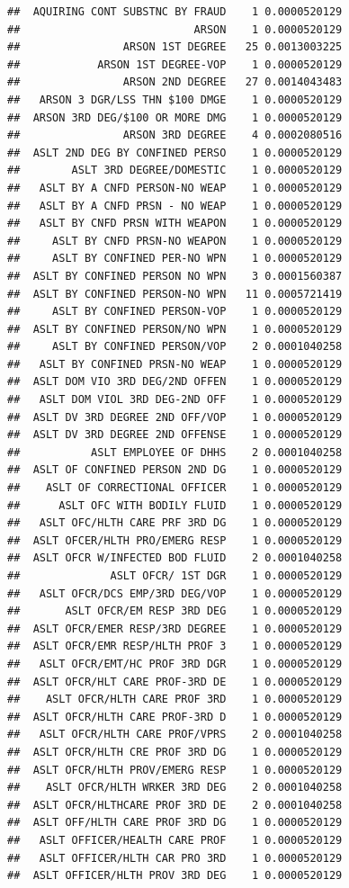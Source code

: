 \documentclass[]{book}
\begin{document}
\begin{verbatim}
##  AQUIRING CONT SUBSTNC BY FRAUD    1 0.0000520129
##                           ARSON    1 0.0000520129
##                ARSON 1ST DEGREE   25 0.0013003225
##            ARSON 1ST DEGREE-VOP    1 0.0000520129
##                ARSON 2ND DEGREE   27 0.0014043483
##   ARSON 3 DGR/LSS THN $100 DMGE    1 0.0000520129
##  ARSON 3RD DEG/$100 OR MORE DMG    1 0.0000520129
##                ARSON 3RD DEGREE    4 0.0002080516
##  ASLT 2ND DEG BY CONFINED PERSO    1 0.0000520129
##        ASLT 3RD DEGREE/DOMESTIC    1 0.0000520129
##   ASLT BY A CNFD PERSON-NO WEAP    1 0.0000520129
##   ASLT BY A CNFD PRSN - NO WEAP    1 0.0000520129
##   ASLT BY CNFD PRSN WITH WEAPON    1 0.0000520129
##     ASLT BY CNFD PRSN-NO WEAPON    1 0.0000520129
##     ASLT BY CONFINED PER-NO WPN    1 0.0000520129
##  ASLT BY CONFINED PERSON NO WPN    3 0.0001560387
##  ASLT BY CONFINED PERSON-NO WPN   11 0.0005721419
##     ASLT BY CONFINED PERSON-VOP    1 0.0000520129
##  ASLT BY CONFINED PERSON/NO WPN    1 0.0000520129
##     ASLT BY CONFINED PERSON/VOP    2 0.0001040258
##   ASLT BY CONFINED PRSN-NO WEAP    1 0.0000520129
##  ASLT DOM VIO 3RD DEG/2ND OFFEN    1 0.0000520129
##   ASLT DOM VIOL 3RD DEG-2ND OFF    1 0.0000520129
##  ASLT DV 3RD DEGREE 2ND OFF/VOP    1 0.0000520129
##  ASLT DV 3RD DEGREE 2ND OFFENSE    1 0.0000520129
##           ASLT EMPLOYEE OF DHHS    2 0.0001040258
##  ASLT OF CONFINED PERSON 2ND DG    1 0.0000520129
##    ASLT OF CORRECTIONAL OFFICER    1 0.0000520129
##      ASLT OFC WITH BODILY FLUID    1 0.0000520129
##   ASLT OFC/HLTH CARE PRF 3RD DG    1 0.0000520129
##  ASLT OFCER/HLTH PRO/EMERG RESP    1 0.0000520129
##  ASLT OFCR W/INFECTED BOD FLUID    2 0.0001040258
##              ASLT OFCR/ 1ST DGR    1 0.0000520129
##   ASLT OFCR/DCS EMP/3RD DEG/VOP    1 0.0000520129
##       ASLT OFCR/EM RESP 3RD DEG    1 0.0000520129
##  ASLT OFCR/EMER RESP/3RD DEGREE    1 0.0000520129
##  ASLT OFCR/EMR RESP/HLTH PROF 3    1 0.0000520129
##   ASLT OFCR/EMT/HC PROF 3RD DGR    1 0.0000520129
##  ASLT OFCR/HLT CARE PROF-3RD DE    1 0.0000520129
##    ASLT OFCR/HLTH CARE PROF 3RD    1 0.0000520129
##  ASLT OFCR/HLTH CARE PROF-3RD D    1 0.0000520129
##   ASLT OFCR/HLTH CARE PROF/VPRS    2 0.0001040258
##  ASLT OFCR/HLTH CRE PROF 3RD DG    1 0.0000520129
##  ASLT OFCR/HLTH PROV/EMERG RESP    1 0.0000520129
##    ASLT OFCR/HLTH WRKER 3RD DEG    2 0.0001040258
##  ASLT OFCR/HLTHCARE PROF 3RD DE    2 0.0001040258
##  ASLT OFF/HLTH CARE PROF 3RD DG    1 0.0000520129
##   ASLT OFFICER/HEALTH CARE PROF    1 0.0000520129
##   ASLT OFFICER/HLTH CAR PRO 3RD    1 0.0000520129
##  ASLT OFFICER/HLTH PROV 3RD DEG    1 0.0000520129

\end{verbatim}
\end{document}
